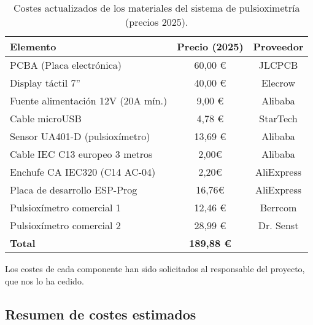 \begin{table}[H]
\centering
\begin{tabular}{|l|c|c|}
\hline
\textbf{Elemento} & \textbf{Precio (2025)} & \textbf{Proveedor} \\
\hline
PCBA (Placa electrónica) & 60,00 € & JLCPCB\footnotemark[3] \\
Display táctil 7”         & 40,00 € & Elecrow\footnotemark[4] \\
Fuente alimentación 12V (20A mín.) & 9,00 € & Alibaba\footnotemark[5] \\
Cable microUSB  & 4,78 € & StarTech\footnotemark[6] \\
Sensor UA401-D (pulsioxímetro) & 13,69 € & Alibaba\footnotemark[5] \\
Cable IEC C13 europeo 3 metros & 2,00€ & Alibaba\footnotemark[5] \\
Enchufe CA IEC320 (C14 AC-04) & 2,20€ & AliExpress\footnotemark[7] \\
Placa de desarrollo ESP-Prog & 16,76€ & AliExpress \footnotemark[7] \\
Pulsioxímetro comercial 1 & 12,46 € & Berrcom\footnotemark[8]\\
Pulsioxímetro comercial 2 & 28,99 € & Dr. Senst\footnotemark[9]\\
\hline
\textbf{Total} & \textbf{189,88 €} & \\
\hline
\end{tabular}
\caption{Costes actualizados de los materiales del sistema de pulsioximetría (precios 2025).}
\label{tab:costes_pulsioximetro}
\end{table}




\noindent Los costes de cada componente han sido solicitados al responsable del proyecto, que nos lo ha cedido. 

\subsection{Resumen de costes estimados}

